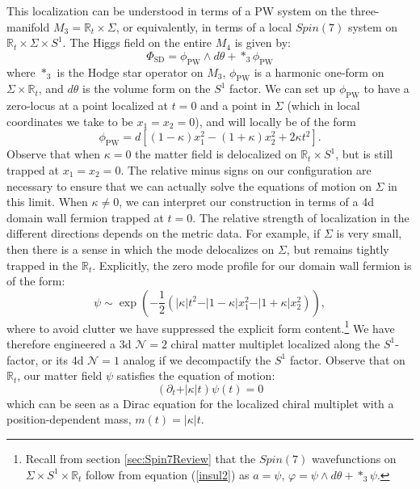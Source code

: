 \documentclass[12pt]{article}%
\numberwithin{equation}{section}
\renewcommand{\(}{\left(}
\renewcommand{\)}{\right)}
\renewcommand{\[}{\left[}
\renewcommand{\]}{\right]}
\begin{document}
This localization can be understood in terms of a PW system on the three-manifold $M_3 = \mathbb{R}_t \times \Sigma$, or equivalently, in terms of a local $Spin(7)$ system on $\mathbb{R}_t \times \Sigma \times S^1$. The Higgs field on the entire $M_4$ is given by:
\begin{equation}
\Phi_{\mathrm{SD}}=\phi_{\mathrm{PW}}\wedge d\theta +*_3 \phi_{\mathrm{PW}}
\end{equation}
where $*_3$ is the Hodge star operator on $M_3$, $\phi_{\mathrm{PW}}$ is a harmonic one-form on $\Sigma\times \mathbb{R}_t$, and
$d \theta$ is the volume form on the $S^1$ factor. We can set
up $\phi_{\mathrm{PW}}$ to have a zero-locus at a point localized at $t=0$ and a point in $\Sigma$ (which in local coordinates we take to be $x_1=x_2=0$), and will locally be of the form
\begin{equation}\label{insul1}
\phi_{\mathrm{PW}}=d[ (1 - \kappa) x_1^2 - (1 + \kappa) x_2^2 + 2 \kappa t^2].
\end{equation}
Observe that when $\kappa = 0$ the matter field is delocalized on $\mathbb{R}_t \times S^1$,
but is still trapped at $x_1 = x_2 = 0$.
The relative minus signs on our configuration are necessary to
ensure that we can actually solve the equations of motion on $\Sigma$ in this limit. When $\kappa \neq 0$,
we can interpret our construction in terms of a 4d domain wall fermion trapped at $t = 0$. The relative strength of localization in the different directions depends on the metric data. For example, if $\Sigma$ is very small, then there is a sense in which the mode delocalizes on $\Sigma$, but remains tightly trapped in the $\mathbb{R}_t$. Explicitly, the zero mode profile for our domain wall fermion is of the form:
\begin{equation}\label{insul2}
\psi \sim \exp\left( -\frac{1}{2} \left( \vert \kappa \vert t^2- \vert 1 - \kappa \vert x_1^2- \vert 1 + \kappa \vert x_2^2 \right) \right),
\end{equation}
where to avoid clutter we have suppressed the explicit form content.\footnote{Recall from section \ref{sec:Spin7Review} that the $Spin(7)$ wavefunctions on $\Sigma\times S^1\times \mathbb{R}_t$ follow from equation (\ref{insul2}) as $a = \psi$, $\varphi=\psi\wedge d\theta +*_3 \psi$.}
We have therefore engineered a 3d $\mathcal{N}=2$ chiral matter multiplet localized along the $S^1$-factor,
or its 4d $\mathcal{N}=1$ analog if we decompactify the $S^1$ factor.
Observe that on $\mathbb{R}_t$, our matter field $\psi$ satisfies the equation of motion:
\begin{equation}\label{eq:4dtdepmass}
(\partial_t+ \vert \kappa \vert t)\psi (t)=0
\end{equation}
which can be seen as a Dirac equation for the localized chiral multiplet with a position-dependent mass, $m(t)= \vert \kappa \vert t$.
\end{document}

